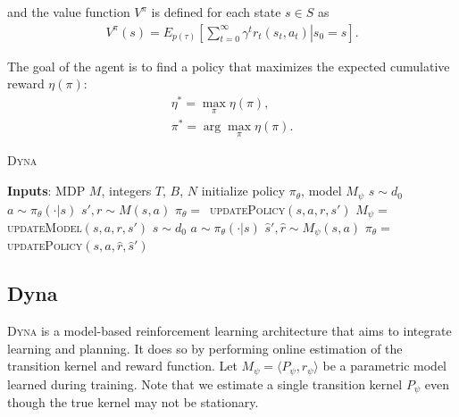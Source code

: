 \documentclass{article}
\begin{document}
 	\noindent
    and the value function $V^\pi$ is defined for each state $s\in S$ as
    \begin{gather}
        V^{\pi}(s) = E_{p(\tau)}\left[ \left. \sum_{t=0}^{\infty} \gamma^t r_t(s_t,a_t) \right\vert s_0=s \right].
    \end{gather}

    The goal of the agent is to find a policy that maximizes the expected cumulative reward $\eta(\pi)$:
    \begin{gather}
    \eta^{*} = \max_{\pi} \eta(\pi),\label{eqn: optimalcost}\\
    \pi^{*} = \arg \max_{\pi} \eta(\pi).\label{eqn: optimalpolicy}
    \end{gather}

    \begin{algorithm}[t]
    	\caption{\textsc{Dyna}}
    	\begin{algorithmic}[1]
    		\STATE \textbf{Inputs}: MDP $M$, integers $T$, $B$, $N$
			\STATE initialize policy $\pi_\theta$, model $M_\psi$
    			\STATE $s \sim d_0$
    			\STATE $a \sim \pi_\theta(\cdot \rvert s)$
    			\STATE $s',r \sim M(s,a)$
				\STATE $\pi_\theta = \,$ \textsc{updatePolicy}$(s,a,r, s')$
    			\STATE $M_\psi = \,$ \textsc{updateModel}$(s,a,r, s')$
        				\STATE  $s \sim d_0$
        				\STATE  $a \sim \pi_\theta(\cdot \rvert s)$
        				\STATE $\hat{s}', \hat{r} \sim M_\psi(s,a)$
        				\STATE $\pi_\theta = \,$ \textsc{updatePolicy}$(s,a,\hat{r}, \hat{s}')$
        			\ENDFOR
        		\ENDIF
    		\ENDFOR
    	\end{algorithmic}
    	\label{algodyna}
    \end{algorithm}
    
\subsection{ Dyna}\label{sec:dyna}
    \textsc{Dyna} \cite{sutton2012dyna} is a model-based reinforcement learning architecture that aims to integrate learning and planning. 
    It does so by performing online estimation of the transition kernel and reward function. Let $M_\psi = \langle P_\psi, r_\psi \rangle$ be a parametric model learned during training. Note that we estimate a single transition kernel $P_\psi$ even though the true kernel may not be stationary.%
    
\end{document}
